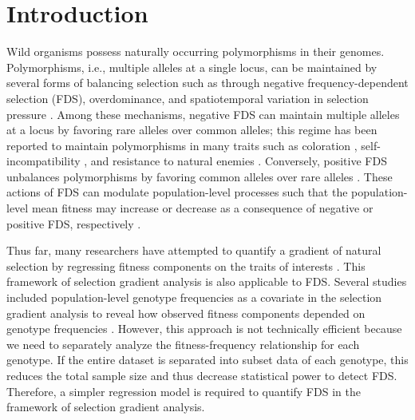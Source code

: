 \documentclass[12pt,]{article}
\begin{document}
\section{Introduction}
Wild organisms possess naturally occurring polymorphisms in their genomes. Polymorphisms, i.e., multiple alleles at a single locus, can be maintained by several forms of balancing selection such as through negative frequency-dependent selection (FDS), overdominance, and spatiotemporal variation in selection pressure \citep{hedrick2007balancing}. Among these mechanisms, negative FDS can maintain multiple alleles at a locus by favoring rare alleles over common alleles; this regime has been reported to maintain polymorphisms in many traits such as coloration \citep{gigord2001negative, takahashi2010negative, le2015evolutionary, nosil2018natural}, self-incompatibility \citep{llaurens2008does, joly2011migration, shimizu2015evolution}, and resistance to natural enemies \citep{antonovics1984experimental, brunet2000disease, sato2017herbivore}. Conversely, positive FDS unbalances polymorphisms by favoring common alleles over rare alleles \citep{borer2010positive, garrido2016effect}. These actions of FDS can modulate population-level processes such that the population-level mean fitness may increase or decrease as a consequence of negative or positive FDS, respectively \citep{takahashi2014evolution,svensson2019frequency}. 

Thus far, many researchers have attempted to quantify a gradient of natural selection by regressing fitness components on the traits of interests \citep[e.g.,][]{lande1983measurement, heisler1987method, mitchell1987regression, chong2018note}. This framework of selection gradient analysis \citep{lande1983measurement} is also applicable to FDS. Several studies included population-level genotype frequencies as a covariate in the selection gradient analysis to reveal how observed fitness components depended on genotype frequencies \citep{mccauley1998frequency, calsbeek2010geographic, sato2017herbivore}. However, this approach is not technically efficient because we need to separately analyze the fitness-frequency relationship for each genotype. If the entire dataset is separated into subset data of each genotype, this reduces the total sample size and thus decrease statistical power to detect FDS. Therefore, a simpler regression model is required to quantify FDS in the framework of selection gradient analysis.
\end{document}
